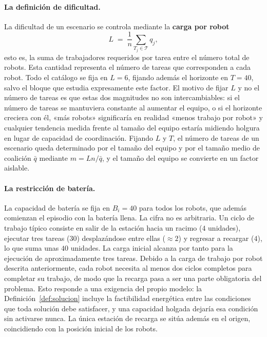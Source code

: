 \paragraph{La definición de dificultad.} La dificultad de un escenario se controla mediante la \textbf{carga por robot}
\begin{equation} \label{eq:carga}
    L \;=\; \frac{1}{n}\sum_{T_j \in \mathcal{T}} q_j,
\end{equation}
esto es, la suma de trabajadores requeridos por tarea entre el número total de robots. Esta cantidad representa el número de tareas que corresponden a cada robot. Todo el catálogo se fija en $L = 6$, fijando además el horizonte en $T = 40$, salvo el bloque que estudia expresamente este factor. El motivo de fijar $L$ y no el número de tareas es que estas dos magnitudes no son intercambiables: si el número de tareas se mantuviera constante al aumentar el equipo, o si el horizonte creciera con él, «más robots» significaría en realidad «menos trabajo por robot» y cualquier tendencia medida frente al tamaño del equipo estaría midiendo holgura en lugar de capacidad de coordinación. Fijando $L$ y $T$, el número de tareas de un escenario queda determinado por el tamaño del equipo y por el tamaño medio de coalición $\bar{q}$ mediante $m = Ln/\bar{q}$, y el tamaño del equipo se convierte en un factor aislable.

\paragraph{La restricción de batería.} La capacidad de batería se fija en $B_i=40$ para todos los robots, que además comienzan el episodio con la batería llena. La cifra no es arbitraria. Un ciclo de trabajo típico consiste en salir de la estación hacia un racimo ($4$ unidades), ejecutar tres tareas ($30$) desplazándose entre ellas ($\approx 2$) y regresar a recargar ($4$), lo que suma unas $40$ unidades. La carga inicial alcanza por tanto para la ejecución de aproximadamente tres tareas. Debido a la carga de trabajo por robot descrita anteriormente, cada robot necesita al menos dos ciclos completos para completar su trabajo, de modo que la recarga pasa a ser una parte obligatoria del problema. Esto responde a una exigencia del propio modelo: la Definición~\ref{def:solucion} incluye la factibilidad energética entre las condiciones que toda solución debe satisfacer, y una capacidad holgada dejaría esa condición sin activarse nunca. La única estación de recarga se sitúa además en el origen, coincidiendo con la posición inicial de los robots.


